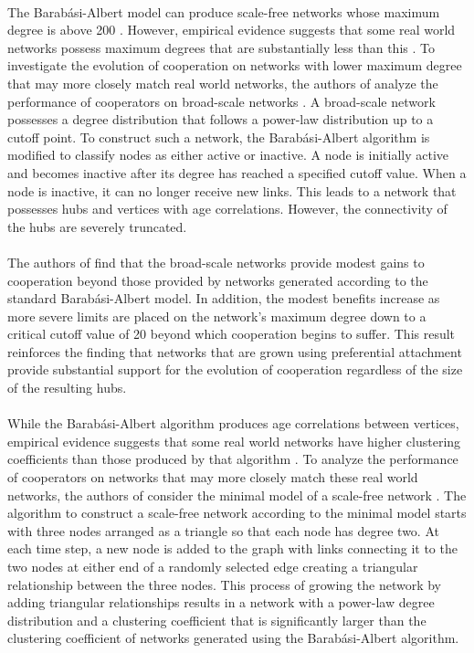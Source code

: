 \documentclass{article}
\begin{document}
	\paragraph{}The Barabási-Albert model can produce scale-free networks whose maximum degree is above 200 \cite{Santos2006a}.  However, empirical evidence suggests that some real world networks possess maximum degrees that are substantially less than this \cite{Dorogovtsev2003}.  To investigate the evolution of cooperation on networks with lower maximum degree that may more closely match real world networks, the authors of \cite{Santos2006a} analyze the performance of cooperators on broad-scale networks \cite{Amaral2000}.  A broad-scale network possesses a degree distribution that follows a power-law distribution up to a cutoff point.  To construct such a network, the Barabási-Albert algorithm is modified to classify nodes as either active or inactive.  A node is initially active and becomes inactive after its degree has reached a specified cutoff value.  When a node is inactive, it can no longer receive new links.  This leads to a network that possesses hubs and vertices with age correlations.  However, the connectivity of the hubs are severely truncated. 
	\paragraph{}The authors of \cite{Santos2006a} find that the broad-scale networks provide modest gains to cooperation beyond those provided by networks generated according to the standard Barabási-Albert model.  In addition, the modest benefits increase as more severe limits are placed on the network’s maximum degree down to a critical cutoff value of 20 beyond which cooperation begins to suffer.  This result reinforces the finding that networks that are grown using preferential attachment provide substantial support for the evolution of cooperation regardless of the size of the resulting hubs.
	\paragraph{}While the Barabási-Albert algorithm produces age correlations between vertices, empirical evidence suggests that some real world networks have higher clustering coefficients than those produced by that algorithm \cite{Dorogovtsev2003}.  To analyze the performance of cooperators on networks that may more closely match these real world networks, the authors of \cite{Santos2006a} consider the minimal model of a scale-free network \cite{Dorogovtsev2001}.  The algorithm to construct a scale-free network according to the minimal model starts with three nodes arranged as a triangle so that each node has degree two.  At each time step, a new node is added to the graph with links connecting it to the two nodes at either end of a randomly selected edge creating a triangular relationship between the three nodes.  This process of growing the network by adding triangular relationships results in a network with a power-law degree distribution and a clustering coefficient that is significantly larger than the clustering coefficient of networks generated using the Barabási-Albert algorithm.
\end{document}
